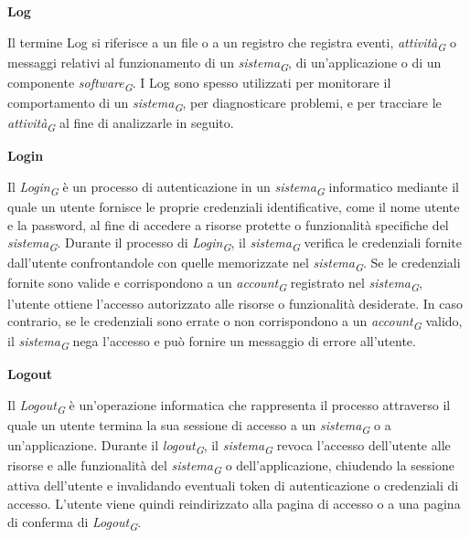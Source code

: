 \documentclass{article}
\begin{document}
\vspace{0.4cm}

\textbf{Log}

\vspace{0.1cm}

Il termine Log si riferisce a un file o a un registro che registra eventi, \textit{attività}\textsubscript{\textit{G}} o messaggi relativi al funzionamento di un \textit{sistema}\textsubscript{\textit{G}}, di un'applicazione o di un componente \textit{software}\textsubscript{\textit{G}}. I Log sono spesso utilizzati per monitorare il comportamento di un \textit{sistema}\textsubscript{\textit{G}}, per diagnosticare problemi, e per tracciare le \textit{attività}\textsubscript{\textit{G}} al fine di analizzarle in seguito.

\vspace{0.4cm}

\textbf{Login}

\vspace{0.1cm}

Il \textit{Login}\textsubscript{\textit{G}} è un processo di autenticazione in un \textit{sistema}\textsubscript{\textit{G}} informatico mediante il quale un utente fornisce le proprie credenziali identificative, come il nome utente e la password, al fine di accedere a risorse protette o funzionalità specifiche del \textit{sistema}\textsubscript{\textit{G}}. Durante il processo di \textit{Login}\textsubscript{\textit{G}}, il \textit{sistema}\textsubscript{\textit{G}} verifica le credenziali fornite dall'utente confrontandole con quelle memorizzate nel \textit{sistema}\textsubscript{\textit{G}}. Se le credenziali fornite sono valide e corrispondono a un \textit{account}\textsubscript{\textit{G}} registrato nel \textit{sistema}\textsubscript{\textit{G}}, l'utente ottiene l'accesso autorizzato alle risorse o funzionalità desiderate. In caso contrario, se le credenziali sono errate o non corrispondono a un \textit{account}\textsubscript{\textit{G}} valido, il \textit{sistema}\textsubscript{\textit{G}} nega l'accesso e può fornire un messaggio di errore all'utente.

\vspace{0.4cm}

\textbf{Logout}

\vspace{0.1cm}

Il \textit{Logout}\textsubscript{\textit{G}} è un'operazione informatica che rappresenta il processo attraverso il quale un utente termina la sua sessione di accesso a un \textit{sistema}\textsubscript{\textit{G}} o a un'applicazione. Durante il \textit{logout}\textsubscript{\textit{G}}, il \textit{sistema}\textsubscript{\textit{G}} revoca l'accesso dell'utente alle risorse e alle funzionalità del \textit{sistema}\textsubscript{\textit{G}} o dell'applicazione, chiudendo la sessione attiva dell'utente e invalidando eventuali token di autenticazione o credenziali di accesso. L'utente viene quindi reindirizzato alla pagina di accesso o a una pagina di conferma di \textit{Logout}\textsubscript{\textit{G}}.
\end{document}

